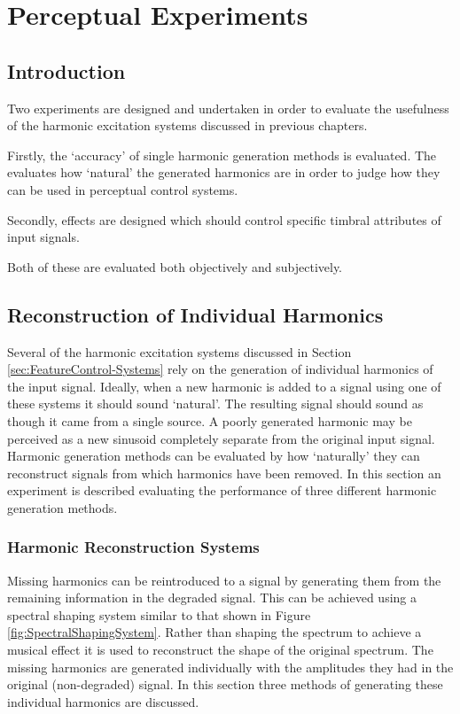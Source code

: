\chapter{Perceptual Experiments}
\label{chap:PerceptualExperiments}

\section{Introduction}
\label{sec:PerceptualExperiments-Introduction}
	\note
	{
		Two experiments are designed and undertaken in order to evaluate the usefulness of the harmonic excitation
		systems discussed in previous chapters.

		Firstly, the `accuracy' of single harmonic generation methods is evaluated. The evaluates how `natural' the
		generated harmonics are in order to judge how they can be used in perceptual control systems.

		Secondly, effects are designed which should control specific timbral attributes of input signals.

		Both of these are evaluated both objectively and subjectively.
	}

\section{Reconstruction of Individual Harmonics}
\label{sec:PerceptualExperiments-Reconstruction}
	Several of the harmonic excitation systems discussed in Section \ref{sec:FeatureControl-Systems} rely on the
	generation of individual harmonics of the input signal. Ideally, when a new harmonic is added to a signal using one
	of these systems it should sound `natural'. The resulting signal should sound as though it came from a single
	source. A poorly generated harmonic may be perceived as a new sinusoid completely separate from the original input
	signal. Harmonic generation methods can be evaluated by how `naturally' they can reconstruct signals from which
	harmonics have been removed. In this section an experiment is described evaluating the performance of three
	different harmonic generation methods.

	\subsection{Harmonic Reconstruction Systems}
	\label{sec:PerceptualExperiments-Reconstruction-Systems}
		Missing harmonics can be reintroduced to a signal by generating them from the remaining information in the
		degraded signal. This can be achieved using a spectral shaping system similar to that shown in Figure
		\ref{fig:SpectralShapingSystem}. Rather than shaping the spectrum to achieve a musical effect it is used to
		reconstruct the shape of the original spectrum. The missing harmonics are generated individually with the
		amplitudes they had in the original (non-degraded) signal. In this section three methods of generating
		these individual harmonics are discussed.

